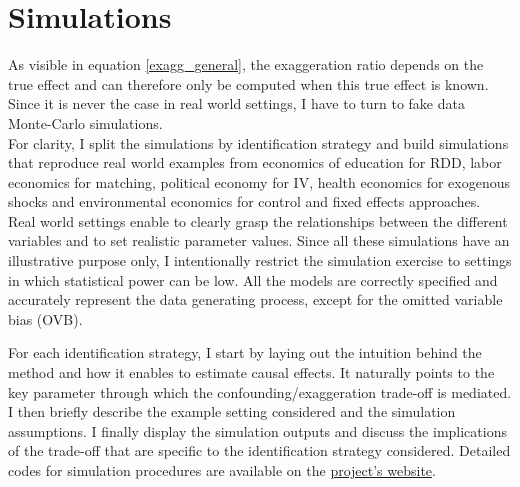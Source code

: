 \documentclass[usletter, 12pt]{article}
\begin{document}


				
	\section{Simulations} \label{simulations}
		
		 As visible in equation \ref{exagg_general},  the exaggeration ratio depends on the true effect and can therefore only be computed when this true effect is known. Since it is never the case in real world settings, I have to turn to fake data Monte-Carlo simulations.\\
    
    For clarity, I split the simulations by identification strategy %
    and build simulations that reproduce real world examples from economics of education for RDD, labor economics for matching, political economy for IV, health economics for exogenous shocks and environmental economics for control and fixed effects approaches. Real world settings enable to clearly grasp the relationships between the different variables and to set realistic parameter values. Since all these simulations have an illustrative purpose only, I intentionally restrict the simulation exercise to settings in which statistical power can be low. All the models are correctly specified and accurately represent the data generating process, except for the omitted variable bias (OVB).
    
     		For each identification strategy, I start by laying out the intuition behind the method and how it enables to estimate causal effects. It naturally points to the key parameter through which the confounding/exaggeration trade-off is mediated. I then briefly describe the example setting considered and the simulation assumptions. I finally display the simulation outputs and discuss the implications of the trade-off that are specific to the identification strategy considered. Detailed codes for simulation procedures are available on the \href{https://vincentbagilet.github.io/causal_inflation/}{project's website}.
		
\end{document}
